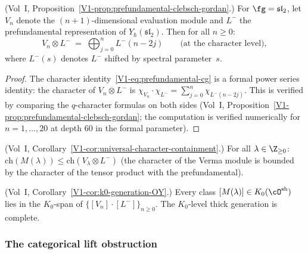 \begin{proposition}
\textup{(Vol~I, Proposition~\ref*{V1-prop:prefundamental-clebsch-gordan}.)}
For $\fg=\mathfrak{sl}_2$, let $V_n$ denote the
$(n+1)$-dimensional evaluation module and $L^-$ the
prefundamental representation of
$Y_\hbar(\mathfrak{sl}_2)$. Then for all $n\ge 0$:
\begin{equation}
V_n\otimes L^-
\;=\;
\bigoplus_{j=0}^{n}L^-(n-2j)
\qquad
\text{(at the character level)},
\end{equation}
where $L^-(s)$ denotes $L^-$ shifted by spectral
parameter~$s$.
\end{proposition}

\begin{proof}
The character identity~\eqref{V1-eq:prefundamental-cg} is a
formal power series identity: the character of $V_n\otimes L^-$
is $\chi_{V_n}\cdot\chi_{L^-}=\sum_{j=0}^n\chi_{L^-(n-2j)}$.
This is verified by comparing the $q$-character formulas
on both sides (Vol~I, Proposition~\ref*{V1-prop:prefundamental-clebsch-gordan}; the computation is verified numerically
for $n=1,\ldots,20$ at depth $60$ in the formal parameter).
\end{proof}

\begin{corollary}
\textup{(Vol~I, Corollary~\ref*{V1-cor:universal-character-containment}.)}
For all $\lambda\in\Z_{\ge 0}$:
$\mathrm{ch}(M(\lambda))\le\mathrm{ch}(V_\lambda\otimes L^-)$
(the character of the Verma module is bounded by the character
of the tensor product with the prefundamental).
\end{corollary}

\begin{corollary}
\textup{(Vol~I, Corollary~\ref*{V1-cor:k0-generation-OY}.)}
Every class $[M(\lambda)]\in K_0(\cO^{\mathrm{sh}})$ lies
in the $K_0$-span of $\{[V_n]\cdot[L^-]\}_{n\ge 0}$.
The $K_0$-level thick generation is complete.
\end{corollary}

\subsubsection{The categorical lift obstruction}

